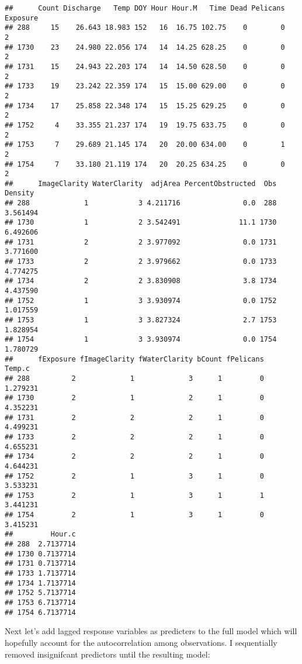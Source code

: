 \documentclass[]{article}
\begin{document}
\begin{verbatim}
##      Count Discharge   Temp DOY Hour Hour.M   Time Dead Pelicans Exposure
## 288     15    26.643 18.983 152   16  16.75 102.75    0        0        2
## 1730    23    24.980 22.056 174   14  14.25 628.25    0        0        2
## 1731    15    24.943 22.203 174   14  14.50 628.50    0        0        2
## 1733    19    23.242 22.359 174   15  15.00 629.00    0        0        2
## 1734    17    25.858 22.348 174   15  15.25 629.25    0        0        2
## 1752     4    33.355 21.237 174   19  19.75 633.75    0        0        2
## 1753     7    29.689 21.145 174   20  20.00 634.00    0        1        2
## 1754     7    33.180 21.119 174   20  20.25 634.25    0        0        2
##      ImageClarity WaterClarity  adjArea PercentObstructed  Obs  Density
## 288             1            3 4.211716               0.0  288 3.561494
## 1730            1            2 3.542491              11.1 1730 6.492606
## 1731            2            2 3.977092               0.0 1731 3.771600
## 1733            2            2 3.979662               0.0 1733 4.774275
## 1734            2            2 3.830908               3.8 1734 4.437590
## 1752            1            3 3.930974               0.0 1752 1.017559
## 1753            1            3 3.827324               2.7 1753 1.828954
## 1754            1            3 3.930974               0.0 1754 1.780729
##      fExposure fImageClarity fWaterClarity bCount fPelicans   Temp.c
## 288          2             1             3      1         0 1.279231
## 1730         2             1             2      1         0 4.352231
## 1731         2             2             2      1         0 4.499231
## 1733         2             2             2      1         0 4.655231
## 1734         2             2             2      1         0 4.644231
## 1752         2             1             3      1         0 3.533231
## 1753         2             1             3      1         1 3.441231
## 1754         2             1             3      1         0 3.415231
##         Hour.c
## 288  2.7137714
## 1730 0.7137714
## 1731 0.7137714
## 1733 1.7137714
## 1734 1.7137714
## 1752 5.7137714
## 1753 6.7137714
## 1754 6.7137714
\end{verbatim}

Next let's add lagged response variables as predicters to the full model
which will hopefully account for the autocorrelation among observations.
I sequentially removed insignifcant predictors until the resulting
model:
\end{document}
